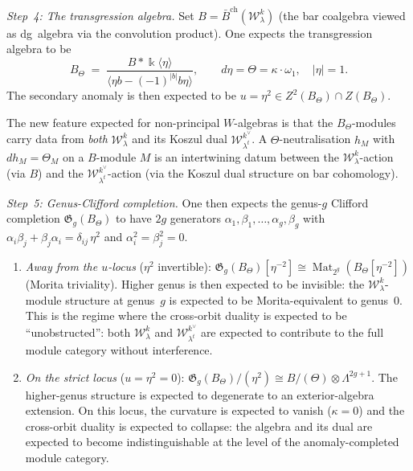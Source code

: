 \begin{construction}
\emph{Step~4: The transgression algebra.}
Set $B=\bar B^{\mathrm{ch}}(\mathcal W_\lambda^k)$
(the bar coalgebra viewed as dg~algebra via the convolution
product). One expects the transgression algebra to be
\[
B_\Theta
\;=\;
\frac{B*\Bbbk\langle\eta\rangle}
{\langle\eta b-(-1)^{|b|}b\eta\rangle},
\qquad
d\eta=\Theta=\kappa\cdot\omega_1,
\quad|\eta|=1.
\]
The secondary anomaly is then expected to be
$u=\eta^2\in Z^2(B_\Theta)\cap Z(B_\Theta)$.

The new feature expected for non-principal $W$-algebras is that the
$B_\Theta$-modules carry data from \emph{both} $\mathcal W_\lambda^k$
and its Koszul dual $\mathcal W_{\lambda^t}^{k^\vee}$. A
$\Theta$-neutralisation
$h_M$ with $dh_M=\Theta_M$ on a $B$-module $M$ is an intertwining
datum between the $\mathcal W_\lambda^k$-action (via $B$) and
the $\mathcal W_{\lambda^t}^{k^\vee}$-action (via the Koszul
dual structure on bar cohomology).

\emph{Step~5: Genus-Clifford completion.}
One then expects the genus-$g$ Clifford completion
$\mathfrak G_g(B_\Theta)$ to have $2g$ generators
$\alpha_1,\beta_1,\dots,\alpha_g,\beta_g$ with
$\alpha_i\beta_j+\beta_j\alpha_i=\delta_{ij}\,\eta^2$ and
$\alpha_i^2=\beta_j^2=0$.

\begin{enumerate}[label=\textup{(\roman*)}]
\item \emph{Away from the $u$-locus} ($\eta^2$ invertible):
 $\mathfrak G_g(B_\Theta)[\eta^{-2}]
 \cong\operatorname{Mat}_{2^g}(B_\Theta[\eta^{-2}])$
 (Morita triviality).
 Higher genus is then expected to be invisible: the $\mathcal W_\lambda^k$-module
 structure at genus~$g$ is expected to be Morita-equivalent to genus~$0$.
 This is the regime where the cross-orbit duality is expected to be
 ``unobstructed'': both $\mathcal W_\lambda^k$ and
 $\mathcal W_{\lambda^t}^{k^\vee}$ are expected to contribute to the
 full module category without interference.

\item \emph{On the strict locus} ($u=\eta^2=0$):
 $\mathfrak G_g(B_\Theta)/(\eta^2)
 \cong B/(\Theta)\otimes\Lambda^{2g+1}$.
 The higher-genus structure is expected to degenerate to an exterior-algebra
 extension. On this locus, the curvature is expected to vanish
 ($\kappa=0$) and the cross-orbit duality is expected to collapse: the
 algebra and its dual are expected to become indistinguishable at the level
 of the anomaly-completed module category.
\end{enumerate}
\end{construction}

